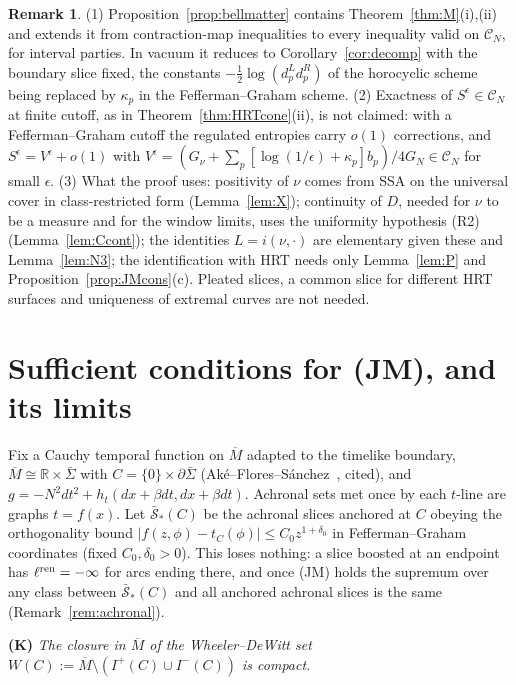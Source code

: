 \documentclass[aps,prd,onecolumn,superscriptaddress,nofootinbib,amsmath,amssymb,11pt]{revtex4-2}
\theoremstyle{definition}
\newtheorem{remark}[theorem]{Remark}
\newcommand{\R}{\mathbb{R}}
\newcommand{\CN}{\mathcal{C}_N}
\newcommand{\eps}{\epsilon}
\newcommand{\Mbar}{\overline{M}}
\begin{document}
\begin{remark}
(1) Proposition~\ref{prop:bellmatter} contains Theorem~\ref{thm:M}(i),(ii) and extends it from contraction-map inequalities to every
inequality valid on $\CN$, for interval parties. In vacuum it reduces to Corollary~\ref{cor:decomp} with the boundary slice fixed,
the constants $-\frac12\log(d_p^Ld_p^R)$ of the horocyclic scheme being replaced by $\kappa_p$ in the Fefferman--Graham scheme. (2) Exactness of
$S^\eps\in\CN$ at finite cutoff, as in Theorem~\ref{thm:HRTcone}(ii), is not claimed: with a Fefferman--Graham cutoff the
regulated entropies carry $o(1)$ corrections, and $S^\eps=V^\eps+o(1)$ with $V^\eps=(G_\nu+\sum_p[\log(1/\eps)+\kappa_p]b_p)/4G_N\in\CN$ for
small $\eps$. (3) What the proof uses: positivity of $\nu$ comes from SSA on the universal cover in class-restricted form
(Lemma~\ref{lem:X}); continuity of $D$, needed for $\nu$ to be a measure and for the window limits, uses the uniformity
hypothesis (R2) (Lemma~\ref{lem:Ccont}); the identities $L=i(\nu,\cdot)$ are elementary given these and Lemma~\ref{lem:N3}; the identification with
HRT needs only Lemma~\ref{lem:P} and Proposition~\ref{prop:JMcons}(c). Pleated slices, a common slice for different HRT surfaces and
uniqueness of extremal curves are not needed.
\end{remark}

\section{Sufficient conditions for (JM), and its limits}\label{sec:JMsuff}

Fix a Cauchy temporal function on $\Mbar$ adapted to the timelike boundary, $\Mbar\cong\R\times\bar\Sigma$ with $C=\{0\}\times\partial\bar\Sigma$
(Ak\'e--Flores--S\'anchez~\cite{AkeFloresSanchez2021}, cited), and $g=-N^2dt^2+h_t(dx+\beta dt,dx+\beta dt)$. Achronal sets met once
by each $t$-line are graphs $t=f(x)$. Let $\bar{\mathcal S}_*(C)$ be the achronal slices anchored at $C$ obeying the
orthogonality bound $|f(z,\phi)-t_C(\phi)|\le C_0z^{1+\delta_0}$ in Fefferman--Graham coordinates (fixed $C_0,\delta_0>0$). This loses
nothing: a slice boosted at an endpoint has $\ell^{\rm ren}=-\infty$ for arcs ending there, and once (JM) holds the supremum over any
class between $\bar{\mathcal S}_*(C)$ and all anchored achronal slices is the same (Remark~\ref{rem:achronal}).

\textbf{(K)} \emph{The closure in $\Mbar$ of the Wheeler--DeWitt set $W(C):=\Mbar\setminus(I^+(C)\cup I^-(C))$ is compact.}
\end{document}
